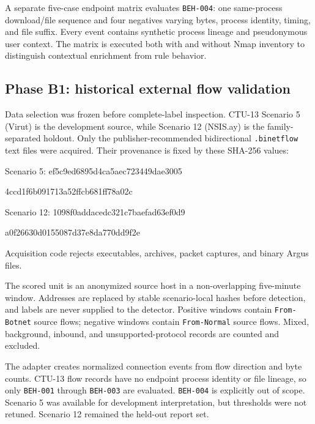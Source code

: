 \documentclass[11pt,a4paper,onecolumn]{IEEEtran}
\begin{document}


A separate five-case endpoint matrix evaluates \texttt{BEH-004}: one same-process download/file sequence and four negatives varying bytes, process identity, timing, and file suffix. Every event contains synthetic process lineage and pseudonymous user context. The matrix is executed both with and without Nmap inventory to distinguish contextual enrichment from rule behavior.

\subsection{Phase B1: historical external flow validation}

Data selection was frozen before complete-label inspection. CTU-13 Scenario 5 (Virut) is the development source, while Scenario 12 (NSIS.ay) is the family-separated holdout. Only the publisher-recommended bidirectional \texttt{.binetflow} text files were acquired. Their provenance is fixed by these SHA-256 values:

{\fontsize{8}{10}\selectfont\ttfamily
\noindent Scenario 5: ef5c9ed6895d4ca5aec723449dae3005\par
\noindent\hspace*{4.8em}4ccd1f6b091713a52ffcb681ff78a02c\par
\noindent Scenario 12: 1098f0addacedc321c7baefad63ef0d9\par
\noindent\hspace*{4.8em}a0f26630d0155087d37e8da770dd9f2e\par}

Acquisition code rejects executables, archives, packet captures, and binary Argus files.

The scored unit is an anonymized source host in a non-overlapping five-minute window. Addresses are replaced by stable scenario-local hashes before detection, and labels are never supplied to the detector. Positive windows contain \texttt{From-Botnet} source flows; negative windows contain \texttt{From-Normal} source flows. Mixed, background, inbound, and unsupported-protocol records are counted and excluded.

The adapter creates normalized connection events from flow direction and byte counts. CTU-13 flow records have no endpoint process identity or file lineage, so only \texttt{BEH-001} through \texttt{BEH-003} are evaluated. \texttt{BEH-004} is explicitly out of scope. Scenario 5 was available for development interpretation, but thresholds were not retuned. Scenario 12 remained the held-out report set.
\end{document}
